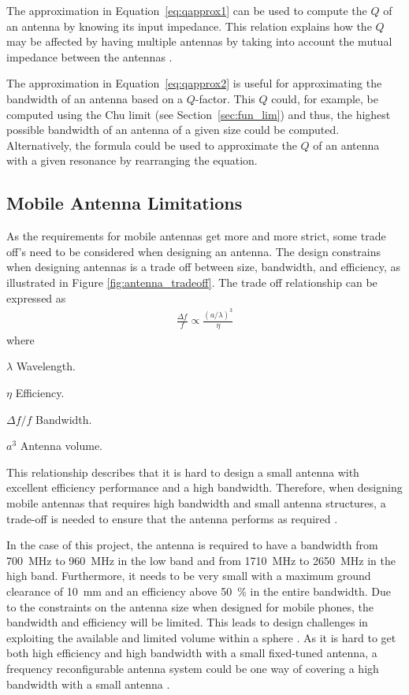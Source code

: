 The approximation in Equation~\ref{eq:qapprox1} can be used to compute the $Q$ of an antenna by knowing its input impedance. This relation explains how the $Q$ may be affected by having multiple antennas by taking into account the mutual impedance between the antennas \cite{balanis2012antenna}.

The approximation in Equation~\ref{eq:qapprox2} is useful for approximating the bandwidth of an antenna based on a $Q$-factor. This $Q$ could, for example, be computed using the Chu limit (see Section~\ref{sec:fun_lim}) and thus, the highest possible bandwidth of an antenna of a given size could be computed. Alternatively, the formula could be used to approximate the $Q$ of an antenna with a given resonance by rearranging the equation.

\FloatBarrier
\subsection{Mobile Antenna Limitations}
\label{subsec:ant_limit}
As the requirements for mobile antennas get more and more strict, some trade off's need to be considered when designing an antenna.
The design constrains when designing antennas is a trade off between size, bandwidth, and efficiency, as illustrated in Figure \ref{fig:antenna_tradeoff}. 
The trade off relationship can be expressed as \cite{hilbert2015tradeoff}
\begin{align} %
  \frac{\Delta f}{f} \propto \frac{(a/ \lambda)^3}{\eta}
\end{align}
where
\begin{where}
\item [$\lambda$] Wavelength.
\item [$\eta$] Efficiency.
\item [$\Delta f / f$] Bandwidth.
\item [$a^3$] Antenna volume.
\end{where}
This relationship describes that it is hard to design a small antenna with excellent efficiency performance and a high bandwidth.
Therefore, when designing mobile antennas that requires high bandwidth and small antenna structures, a trade-off is needed to ensure that the antenna performs as required \cite{hilbert2015tradeoff}.

In the case of this project, the antenna is required to have a bandwidth from \SI{700}{MHz} to \SI{960}{MHz} in the low band and from \SI{1710}{MHz} to \SI{2650}{MHz} in the high band. Furthermore, it needs to be very small with a maximum ground clearance of \SI{10}{mm} and an efficiency above \SI{50}{\percent} in the entire bandwidth. Due to the constraints on the antenna size when designed for mobile phones, the bandwidth and efficiency will be limited. This leads to design challenges in exploiting the available and limited volume within a sphere \cite{balanis2012antenna}.
As it is hard to get both high efficiency and high bandwidth with a small fixed-tuned antenna, a frequency reconfigurable antenna system could be one way of covering a high bandwidth with a small antenna \cite{hilbert2015tradeoff}.  

